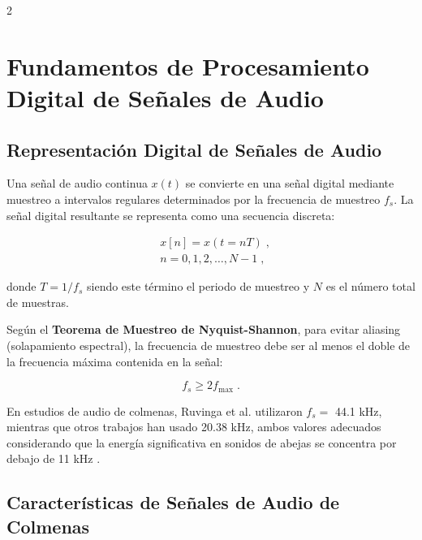 \documentclass[12pt]{report}
\newenvironment{tightmulticols}{%
  \begin{multicols}{2}
  \setlength{\parskip}{1.2pt}
  \linespread{1}\selectfont
}{%
  \end{multicols}
}
\begin{document}
\begin{tightmulticols}

\section{Fundamentos de Procesamiento Digital de Señales de Audio}

\subsection{Representación Digital de Señales de Audio}

\noindent Una señal de audio continua $x(t)$ se convierte en una señal digital mediante muestreo a intervalos regulares determinados por la frecuencia de muestreo $f_s$. La señal digital resultante se representa como una secuencia discreta:

\begin{equation}
    \begin{split}
        &x[n] = x(t = nT) \; , \\[0.6ex]
        &n = 0, 1, 2, \ldots, N-1 \; ,
    \end{split}
\end{equation}

\noindent donde $T = 1/f_s$ siendo este término el periodo de muestreo y $N$ es el número total de muestras.

\par Según el \textbf{Teorema de Muestreo de Nyquist-Shannon}, para evitar aliasing (solapamiento espectral), la frecuencia de muestreo debe ser al menos el doble de la frecuencia máxima contenida en la señal:

\begin{equation}
    f_s \geq 2f_{\text{max}} \; .
\end{equation}

\noindent En estudios de audio de colmenas, Ruvinga et al. \cite{ruvinga2023} utilizaron $f_s =$ 44.1 kHz, mientras que otros trabajos han usado 20.38 kHz, ambos valores adecuados considerando que la energía significativa en sonidos de abejas se concentra por debajo de 11 kHz \cite{ruvinga2023}.

\subsection{Características de Señales de Audio de Colmenas}


\end{tightmulticols}
\end{document}
